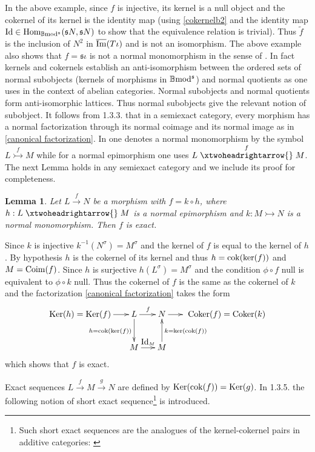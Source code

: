 \documentclass[12pt]{article}
\newtheorem{lem}[thm]{Lemma}
\def\Hom{{\rm Hom}}
\def\id{{\rm id}}
\def\Ker{{\rm Ker}}
\def\sker{{\rm ker}}
\def\coker{{\rm Coker}}
\def\scoker{{\rm cok}}
\def\B{{\mathbb B}}
\def\imm{\overline{\rm Im}}
\def\coimm{{\rm Coim}}
\def\id{{\mbox{Id}}}
\def\ker{{\mbox{Ker}}}
\def\Hom {{\mbox{Hom}}}
\def\yb{\mathfrak{s}}
\def\b2{{\rm \B mod^{\mathfrak s}}}
\begin{document}
In the above example, since $f$ is injective, its kernel is a null object and the cokernel of its kernel is the identity map (using \eqref{cokernelb2} and the identity map $\id\in \Hom_\b2(\yb N,\yb N)$ to show that the equivalence relation is trivial).  Thus $\tilde f$ is the inclusion of $N^2$ in $\imm(T\iota)$ and is not an isomorphism.  The above example also shows that $f=\yb\iota$ is not a normal monomorphism in the sense of \cite{gra}. In fact kernels and cokernels establish an anti-isomorphism between the ordered sets of normal subobjects (kernels of morphisms in $\b2$) and normal quotients as one uses in the context of abelian categories. Normal subobjects and normal quotients form anti-isomorphic lattices. Thus normal subobjects give the relevant notion of subobject. It follows from \cite{gra1} 1.3.3. that in a semiexact category, every morphism has a normal factorization through its normal coimage and its normal image as in \eqref{canonical factorization}. In \cite{gra1} one denotes a normal monomorphism by the symbol
  $L\stackrel{f}{\rightarrowtail} M$ while for a normal epimorphism one uses
  $L\stackrel{f}{\xtwoheadrightarrow{}} M$. The next Lemma holds in any semiexact category and we include its proof for completeness. 
  \begin{lem}\label{exact examples} Let $L\stackrel{f}{\to}N$ be a morphism with $f=k\circ h$, where   $h:L \stackrel{}{\xtwoheadrightarrow{}}  M$ is a normal epimorphism and $k:M \stackrel{}{\rightarrowtail} N$ is a  normal monomorphism. Then $f$ is exact. \end{lem}
 \proof Since $k$ is injective  $k^{-1}(N^\sigma)=M^\sigma$ and the kernel of $f$ is equal to the kernel of $h$. By hypothesis $h$ is the cokernel of its kernel and thus $h=\scoker(\sker(f))$ and $M=\coimm(f)$. Since $h$ is surjective  $h(L^\sigma)=M^\sigma$ and the condition $\phi\circ f$ null is equivalent to $\phi\circ k$ null. Thus the cokernel of $f$ is the same as the cokernel of $k$ and the factorization \eqref{canonical factorization} takes the form
   \begin{equation}\label{canonical factorization bis}
\xymatrix@C=5pt@R=25pt{
\ker(h) =\ker(f)\ar[rr]^{}  &&
L \ar[d]_{h=\scoker(\sker(f))}\ar[rr]^{f} && N\ar[rr]^{}&&\, \, \coker(f)=\coker(k)
\\
&&M \ar[rr]^{\id_M}&& M\ar[u]_{k=\sker(\scoker(f))}}
\end{equation}
 which shows that $f$ is exact.\endproof
 

 Exact sequences $L\stackrel{f}{\to}M\stackrel{g}{\to}N$ are defined by $\Ker(\scoker(f))=\Ker(g)$. In \cite{gra1} 1.3.5. the following notion of short exact sequence\footnote{Such short exact sequences are the analogues of the kernel-cokernel pairs in additive categories: \cite{Buhler}} is introduced. 
 
\end{document}
